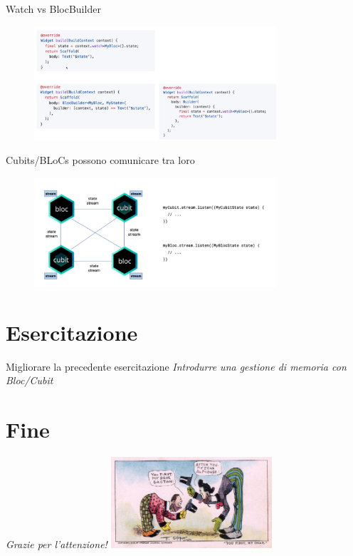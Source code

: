 \documentclass{../libs/presentation_format}
\begin{document}

\begin{frame}{Watch vs BlocBuilder}
	\begin{figure}[htpb]
		\centering
		\includegraphics[width=9cm]{../libs/watch-vs-builder}
	\end{figure}
\end{frame}


\begin{frame}{Cubits/BLoCs possono comunicare tra loro}
	\begin{figure}[htpb]
		\centering
		\includegraphics[width=9cm]{../libs/cubit-bloc-stream-communication}
	\end{figure}
\end{frame}


\section{Esercitazione}
\begin{frame}{Migliorare la precedente esercitazione}
	\emph{Introdurre una gestione di memoria con Bloc/Cubit}
\end{frame}



\section{Fine}
\begin{frame}{}
	\huge\emph{Grazie per l'attenzione!}
	\newline
	\vfill
	\hfill\includegraphics[width=6cm]{../libs/alphonse-gaston-regards}
\end{frame}
\end{document}
